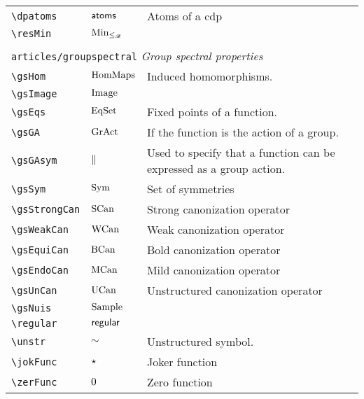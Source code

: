 \begin{longtable}{lll}
 {\color[rgb]{0.5,0.5,0.5}\texttt{\textbackslash dpatoms}} & $\mathsf{atoms}$ &  Atoms of a cdp\\ 
 {\color[rgb]{0.5,0.5,0.5}\texttt{\textbackslash resMin}} & ${\operatorname*{Min}_{\leq_{\mathscr{R}}}}$ & \\ 
  &  & \\ 
 \multicolumn{3}{l}{{\color[rgb]{0.5,0.5,0.5}\texttt{articles/groupspectral}} \emph{Group spectral properties}}\\ 
 \hline
{\color[rgb]{0.5,0.5,0.5}\texttt{\textbackslash gsHom}} & $\text{HomMaps}$ &  Induced homomorphisms.\\ 
 {\color[rgb]{0.5,0.5,0.5}\texttt{\textbackslash gsImage}} & $\text{Image}$ &  \\ 
 {\color[rgb]{0.5,0.5,0.5}\texttt{\textbackslash gsEqs}} & $\text{EqSet}$ &  Fixed points of a function.\\ 
 {\color[rgb]{0.5,0.5,0.5}\texttt{\textbackslash gsGA}} & $\text{GrAct}$ &  If the function is the action of a group.\\ 
 {\color[rgb]{0.5,0.5,0.5}\texttt{\textbackslash gsGAsym}} & $\parallel$ &  Used to specify that a function can be expressed as a group action.\\ 
 {\color[rgb]{0.5,0.5,0.5}\texttt{\textbackslash gsSym}} & $\text{Sym}$ &  Set of symmetries\\ 
 {\color[rgb]{0.5,0.5,0.5}\texttt{\textbackslash gsStrongCan}} & $\text{SCan}$ &  Strong canonization operator\\ 
 {\color[rgb]{0.5,0.5,0.5}\texttt{\textbackslash gsWeakCan}} & $\text{WCan}$ &  Weak canonization operator\\ 
 {\color[rgb]{0.5,0.5,0.5}\texttt{\textbackslash gsEquiCan}} & $\text{BCan}$ &  Bold canonization operator\\ 
 {\color[rgb]{0.5,0.5,0.5}\texttt{\textbackslash gsEndoCan}} & $\text{MCan}$ &  Mild canonization operator\\ 
 {\color[rgb]{0.5,0.5,0.5}\texttt{\textbackslash gsUnCan}} & $\text{UCan}$ &  Unstructured canonization operator\\ 
 {\color[rgb]{0.5,0.5,0.5}\texttt{\textbackslash gsNuis}} & $\text{Sample}$ &  \\ 
 {\color[rgb]{0.5,0.5,0.5}\texttt{\textbackslash regular}} & $\mathsf{regular}$ & \\ 
 {\color[rgb]{0.5,0.5,0.5}\texttt{\textbackslash unstr}} & $\sim$ &  Unstructured symbol.\\ 
 {\color[rgb]{0.5,0.5,0.5}\texttt{\textbackslash jokFunc}} & $\star$ &  Joker function\\ 
 {\color[rgb]{0.5,0.5,0.5}\texttt{\textbackslash zerFunc}} & $0$ &  Zero function\\ 

\end{longtable}
